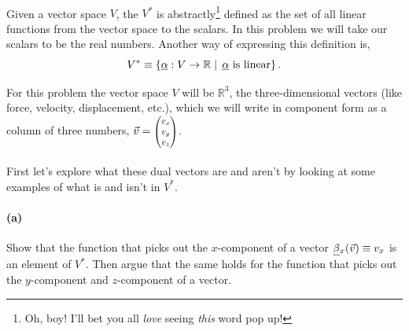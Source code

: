 \documentclass{article}
\begin{document}
\paragraph{}
Given a vector space $V$, the  $V^{*}$ is abstractly\footnote{Oh, boy!  I'll bet you all \emph{love} seeing \emph{this} word pop up!} 
defined as the set of all linear functions from the vector space to the scalars.  In this problem we will take our scalars to be the real numbers.  Another way of expressing this definition is,
	\begin{equation*}
		V^{*} \equiv \left\{\underline{\alpha}:V\to\mathbb{R}\mid \ \! \underline{\alpha}\textrm{ is linear}\right\}.
	\end{equation*}

For this problem the vector space $V$ will be $\mathbb{R}^{3}$, the three-dimensional vectors (like force, velocity, displacement, etc.), which we will write in
component form as a column of three numbers, $\vec{v} = \smthreevect{v_{x}}{v_{y}}{v_{z}}$.  

\phline
\paragraph{}
First let's explore what these dual vectors are and aren't by looking at some examples of what is and isn't in $V^{*}$. 


\paragraph{(a)}
Show that the function that picks out the $x$-component of a vector $\underline{\beta}{}_{x}(\vec{v}) \equiv v_{x}$ is an element of $V^{*}$.  Then argue that the same holds
for the function that picks out the $y$-component and $z$-component of a vector.\\
\end{document}
